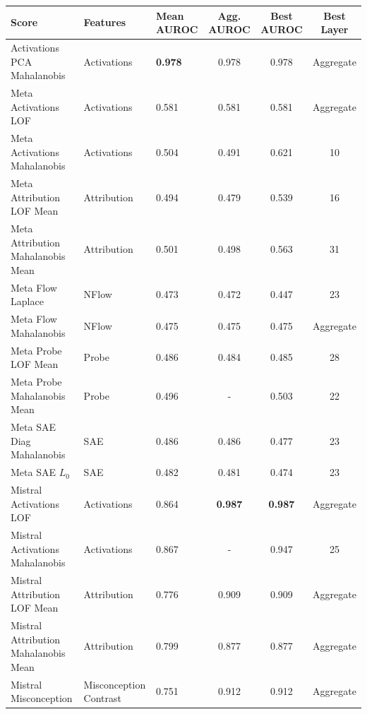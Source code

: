\begin{table}[H]
\centering
\scriptsize  %
\renewcommand{\arraystretch}{1.2}  %
\setlength{\tabcolsep}{2pt}  %
\begin{tabular}{lp{3cm}lccc}
\toprule
\textbf{Score} & \textbf{Features} & \textbf{Mean AUROC} & \textbf{Agg. AUROC} & \textbf{Best AUROC} & \textbf{Best Layer} \\
\midrule
Activations PCA Mahalanobis          & Activations & \textbf{0.978}  & 0.978  & 0.978  & Aggregate \\ 
Meta Activations LOF                 & Activations & 0.581  & 0.581  & 0.581  & Aggregate \\ 
Meta Activations Mahalanobis         & Activations & 0.504  & 0.491  & 0.621  & 10 \\ 
Meta Attribution LOF Mean            & Attribution & 0.494  & 0.479  & 0.539  & 16 \\ 
Meta Attribution Mahalanobis Mean    & Attribution & 0.501  & 0.498  & 0.563  & 31 \\ 
Meta Flow Laplace                    & NFlow      & 0.473  & 0.472  & 0.447  & 23 \\ 
Meta Flow Mahalanobis                & NFlow      & 0.475  & 0.475  & 0.475  & Aggregate \\ 
Meta Probe LOF Mean                  & Probe      & 0.486  & 0.484  & 0.485  & 28 \\ 
Meta Probe Mahalanobis Mean          & Probe      & 0.496  & -      & 0.503  & 22 \\ 
Meta SAE Diag Mahalanobis            & SAE        & 0.486  & 0.486  & 0.477  & 23 \\ 
Meta SAE $L_0$                          & SAE        & 0.482  & 0.481  & 0.474  & 23 \\ 
Mistral Activations LOF              & Activations & 0.864  & \textbf{0.987}  & \textbf{0.987}  & Aggregate \\ 
Mistral Activations Mahalanobis      & Activations & 0.867  & -      & 0.947  & 25 \\ 
Mistral Attribution LOF Mean         & Attribution & 0.776  & 0.909  & 0.909  & Aggregate \\ 
Mistral Attribution Mahalanobis Mean & Attribution & 0.799  & 0.877  & 0.877  & Aggregate \\ 
Mistral Misconception                & Misconception Contrast & 0.751  & 0.912  & 0.912  & Aggregate \\ 

\end{tabular}
\end{table}
